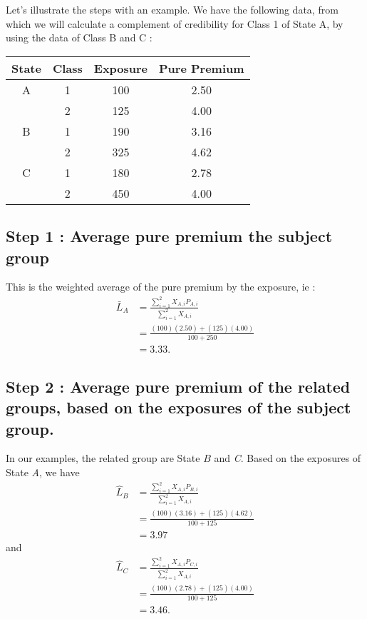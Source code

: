 \documentclass[11pt, english]{memoir}
\numberwithin{definition}{section}
\newcommand{\mean}[1]{\bar{#1}}
\begin{document}
Let's illustrate the steps with an example. We have the following data, from which we will calculate a complement of credibility for Class 1 of State A, by using the data of Class B and C : 

\begin{tabular}{cccc}
	State & Class & Exposure & Pure Premium\\
	\midrule
	A & 1 & 100  & 2.50 \\
	& 2 & 125 & 4.00 \\
	\midrule
	B & 1 & 190 & 3.16 \\
	& 2 & 325 & 4.62\\
	\midrule
	C & 1 & 180 & 2.78 \\
	& 2 & 450 & 4.00 \\
\end{tabular}

\subsection*{Step 1 : Average pure premium the subject group}

This is the weighted average of the pure premium by the exposure, ie : 
\begin{align*}
\mean{L}_{A} 	&= \frac{\sum_{i = 1}^{2} X_{A,i}P_{A, i}}{\sum_{i = 1}^{2} X_{A,i}}\\
				&= \frac{(100)(2.50) + (125)(4.00)}{100 + 250}\\
				&= 3.33.
\end{align*}

\subsection*{Step 2 : Average pure premium of the related groups, based on the exposures of the subject group.}

In our examples, the related group are State $ B $ and \emph{C}. Based on the exposures of State \emph{A}, we have 
\begin{align*}
\hat{L}_{B} 	&= \frac{\sum_{i = 1}^{2} X_{A,i}P_{B, i}}{\sum_{i = 1}^{2} X_{A,i}}\\
				&= \frac{(100)(3.16) + (125)(4.62)}{100+125}\\
				&= 3.97
\end{align*}
and
\begin{align*}
\hat{L}_{C} 	&= \frac{\sum_{i = 1}^{2} X_{A,i}P_{C, i}}{\sum_{i = 1}^{2} X_{A,i}}\\
				&= \frac{(100)(2.78) + (125)(4.00)}{100+125}\\
				&= 3.46.
\end{align*}
\end{document}
